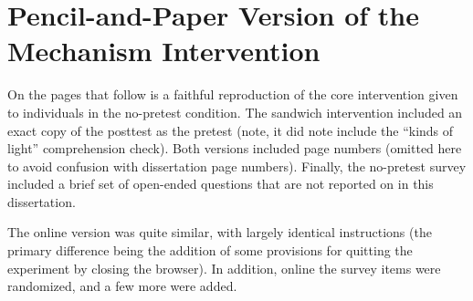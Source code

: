 \graphicspath{{appendices/mech-intervention}}
\chapter{Pencil-and-Paper Version of the Mechanism Intervention}
\label{app:mech-format}

On the pages that follow is a faithful reproduction of the core intervention
given to individuals in the no-pretest condition. The sandwich intervention
included an exact copy of the posttest as the pretest (note, it did note include
the “kinds of light” comprehension check). Both versions included page numbers
(omitted here to avoid confusion with dissertation page numbers). Finally, the
no-pretest survey included a brief set of open-ended questions that are not
reported on in this dissertation.

The online version was quite similar, with largely identical instructions (the
primary difference being the addition of some provisions for quitting the
experiment by closing the browser). In addition, online the survey items were
randomized, and a few more were added.


